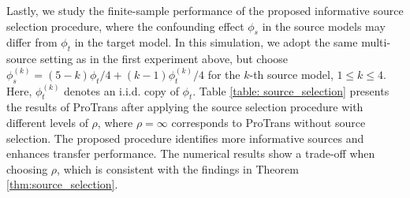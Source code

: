 \documentclass[12pt]{article}
\begin{document}




Lastly, we study the finite-sample performance of the proposed informative source selection procedure, where the confounding effect $\phi_s$ in the source models may differ from $\phi_t$ in the target model. In this simulation, we adopt the same multi-source setting as in the first experiment above, but choose $\phi_s^{(k)} = (5-k)\phi_t/4  + (k-1)\phi_t^{(k)}/4 $ for the $k$-th source model, $1\le k \le 4$. Here, $\phi_t^{(k)}$ denotes an i.i.d. copy of $\phi_t$. Table \ref{table: source_selection} presents the results of ProTrans after applying the source selection procedure with different levels of $\rho$, where $\rho =\infty$ corresponds to ProTrans without source selection. The proposed procedure identifies more informative sources and enhances transfer performance. The numerical results show a trade-off when choosing $\rho$, which is consistent with the findings in Theorem \ref{thm:source_selection}. 
\end{document}
